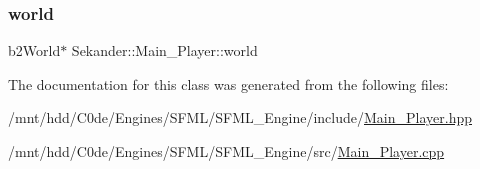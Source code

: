 \subsubsection{\texorpdfstring{world}{world}}
{\footnotesize\ttfamily b2\+World$\ast$ Sekander\+::\+Main\+\_\+\+Player\+::world\hspace{0.3cm}{\ttfamily [private]}}



The documentation for this class was generated from the following files\+:\begin{DoxyCompactItemize}
\item 
/mnt/hdd/\+C0de/\+Engines/\+S\+F\+M\+L/\+S\+F\+M\+L\+\_\+\+Engine/include/\hyperlink{Main__Player_8hpp}{Main\+\_\+\+Player.\+hpp}\item 
/mnt/hdd/\+C0de/\+Engines/\+S\+F\+M\+L/\+S\+F\+M\+L\+\_\+\+Engine/src/\hyperlink{Main__Player_8cpp}{Main\+\_\+\+Player.\+cpp}\end{DoxyCompactItemize}
